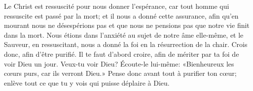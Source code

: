 Le Christ est ressuscité pour nous donner l’espérance,
	car tout homme qui ressuscite est passé par la mort;
	et il nous a donné cette assurance,
	afin qu’en mourant nous ne désespérions pas
	et que nous ne pensions pas que notre vie finit dans la mort.
Nous étions dans l’anxiété au sujet de notre âme elle-même,
	et le Sauveur, en ressuscitant,
	nous a donné la foi en la résurrection de la chair.
Crois donc, afin d’être purifié.
	Il te faut d’abord croire, afin de mériter par ta foi de voir Dieu un jour.
Veux-tu voir Dieu? Écoute-le lui-même:
	«Bienheureux les cœurs purs, car ils verront Dieu.»
	Pense donc avant tout à purifier ton cœur;
	enlève tout ce que tu y vois qui puisse déplaire à Dieu.

